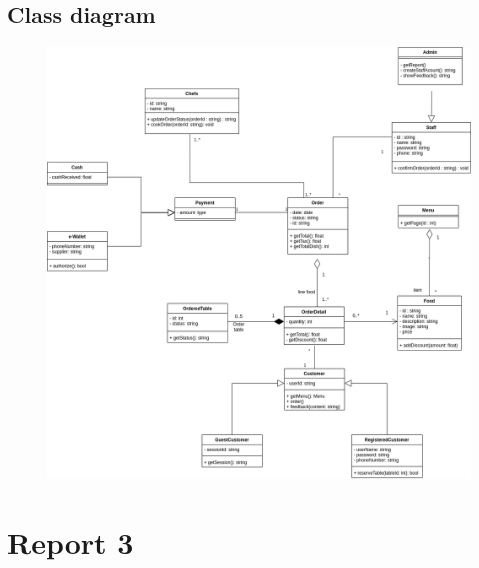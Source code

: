 \documentclass[11pt]{article}
\begin{document}
    \subsection{Class diagram}
    \begin{figure}[!h]
        \centering
        \includegraphics[width=17cm]{ClassDiagram.png}
    \end{figure}
\cleardoublepage
\section{Report 3}
\end{document}
